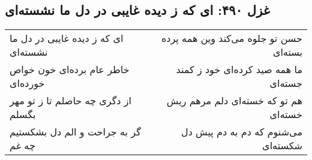 \begin{center}
\section*{غزل ۴۹۰: ای که ز دیده غایبی در دل ما نشسته‌ای}
\label{sec:490}
\begin{longtable}{l p{0.5cm} r}
ای که ز دیده غایبی در دل ما نشسته‌ای
&&
حسن تو جلوه می‌کند وین همه پرده بسته‌ای
\\
خاطر عام برده‌ای خون خواص خورده‌ای
&&
ما همه صید کرده‌ای خود ز کمند جسته‌ای
\\
از دگری چه حاصلم تا ز تو مهر بگسلم
&&
هم تو که خسته‌ای دلم مرهم ریش خسته‌ای
\\
گر به جراحت و الم دل بشکستیم چه غم
&&
می‌شنوم که دم به دم پیش دل شکسته‌ای
\\
\end{longtable}
\end{center}
